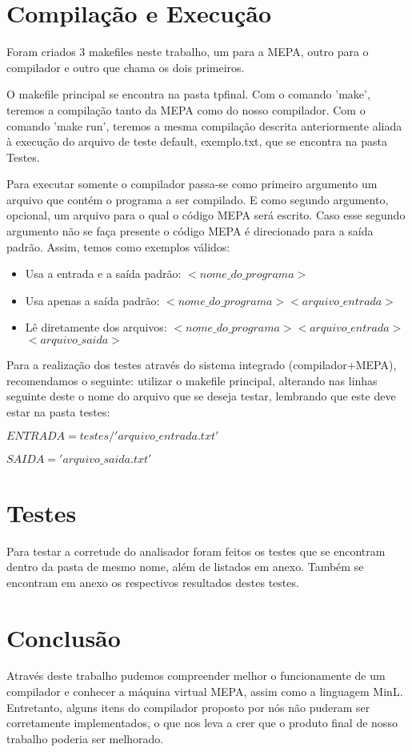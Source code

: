 \documentclass[a4paper,12pt]{article}
\begin{document}
\section{Compilação e Execução}
Foram criados 3 makefiles neste trabalho, um para a MEPA, outro para o compilador e outro que chama os dois primeiros. 

O makefile principal se encontra na pasta tpfinal. Com o comando 'make', teremos a compilação tanto da MEPA como do nosso compilador. Com o comando 'make run', teremos a mesma compilação descrita anteriormente aliada à execução do arquivo de teste default, exemplo.txt, que se encontra na pasta Testes.

Para executar somente o compilador passa-se como primeiro argumento um arquivo que contém o programa a ser compilado. E como segundo argumento, opcional, um arquivo para o qual o código MEPA será escrito. Caso esse segundo argumento não se faça presente o código MEPA é direcionado para a saída padrão. Assim, temos como exemplos válidos: 
\begin{itemize}
 \item Usa a entrada e a saída padrão: \textit{$<nome\_do\_programa>$ }
 \item Usa apenas a saída padrão: \textit{$<nome\_do\_programa> <arquivo\_entrada>$}
\item Lê diretamente dos arquivos: \textit{$<nome\_do\_programa> <arquivo\_entrada>$ $<arquivo\_saida>$}
\end{itemize}

Para a realização dos testes através do sistema integrado (compilador+MEPA), recomendamos o seguinte: utilizar o makefile principal, alterando nas linhas seguinte deste o nome do arquivo que se deseja testar, lembrando que este deve estar na pasta testes:

\textit{$ENTRADA = testes/'arquivo\_entrada.txt'$}

\textit{$SAIDA = 'arquivo\_saida.txt'$}

\section{Testes}
Para testar a corretude do analisador foram feitos os testes que se encontram dentro da pasta de mesmo nome, além de listados em anexo. Também se encontram em anexo os respectivos resultados destes testes.

\section{Conclusão}
Através deste trabalho pudemos compreender melhor o funcionamente de um compilador e conhecer a máquina virtual MEPA, assim como a linguagem MinL. Entretanto, alguns itens do compilador proposto por nós não puderam ser corretamente implementados, o que nos leva a crer que o produto final de nosso trabalho poderia ser melhorado.
\end{document}
